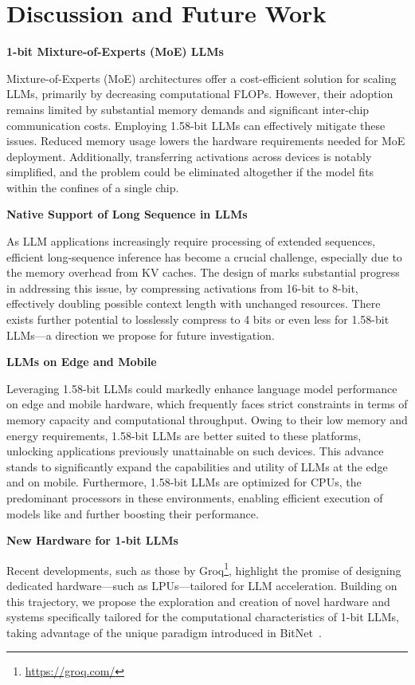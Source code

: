 \section{Discussion and Future Work}

\textbf{1-bit Mixture-of-Experts (MoE) LLMs}

Mixture-of-Experts (MoE) architectures offer a cost-efficient solution for scaling LLMs, primarily by decreasing computational FLOPs. However, their adoption remains limited by substantial memory demands and significant inter-chip communication costs. Employing 1.58-bit LLMs can effectively mitigate these issues. Reduced memory usage lowers the hardware requirements needed for MoE deployment. Additionally, transferring activations across devices is notably simplified, and the problem could be eliminated altogether if the model fits within the confines of a single chip.

\textbf{Native Support of Long Sequence in LLMs}

As LLM applications increasingly require processing of extended sequences, efficient long-sequence inference has become a crucial challenge, especially due to the memory overhead from KV caches. The design of  marks substantial progress in addressing this issue, by compressing activations from 16-bit to 8-bit, effectively doubling possible context length with unchanged resources. There exists further potential to losslessly compress to 4 bits or even less for 1.58-bit LLMs—a direction we propose for future investigation.

\textbf{LLMs on Edge and Mobile}

Leveraging 1.58-bit LLMs could markedly enhance language model performance on edge and mobile hardware, which frequently faces strict constraints in terms of memory capacity and computational throughput. Owing to their low memory and energy requirements, 1.58-bit LLMs are better suited to these platforms, unlocking applications previously unattainable on such devices. This advance stands to significantly expand the capabilities and utility of LLMs at the edge and on mobile. Furthermore, 1.58-bit LLMs are optimized for CPUs, the predominant processors in these environments, enabling efficient execution of models like  and further boosting their performance.

\textbf{New Hardware for 1-bit LLMs}

Recent developments, such as those by Groq\footnote{\url{https://groq.com/}}, highlight the promise of designing dedicated hardware—such as LPUs—tailored for LLM acceleration. Building on this trajectory, we propose the exploration and creation of novel hardware and systems specifically tailored for the computational characteristics of 1-bit LLMs, taking advantage of the unique paradigm introduced in BitNet~\cite{bitnet}.

